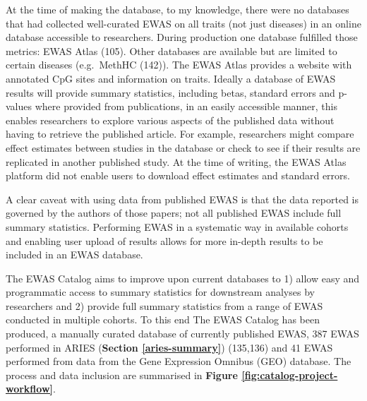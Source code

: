\documentclass[11pt,oneside]{bristolthesis}
\begin{document}
At the time of making the database, to my knowledge, there were no databases that had collected well-curated EWAS on all traits (not just diseases) in an online database accessible to researchers. During production one database fulfilled those metrics: EWAS Atlas (105). Other databases are available but are limited to certain diseases (e.g.~MethHC (142)). The EWAS Atlas provides a website with annotated CpG sites and information on traits. Ideally a database of EWAS results will provide summary statistics, including betas, standard errors and p-values where provided from publications, in an easily accessible manner, this enables researchers to explore various aspects of the published data without having to retrieve the published article. For example, researchers might compare effect estimates between studies in the database or check to see if their results are replicated in another published study. At the time of writing, the EWAS Atlas platform did not enable users to download effect estimates and standard errors.

A clear caveat with using data from published EWAS is that the data reported is governed by the authors of those papers; not all published EWAS include full summary statistics. Performing EWAS in a systematic way in available cohorts and enabling user upload of results allows for more in-depth results to be included in an EWAS database.

The EWAS Catalog aims to improve upon current databases to 1) allow easy and programmatic access to summary statistics for downstream analyses by researchers and 2) provide full summary statistics from a range of EWAS conducted in multiple cohorts. To this end The EWAS Catalog has been produced, a manually curated database of currently published EWAS, 387 EWAS performed in ARIES (\textbf{Section \ref{aries-summary}}) (135,136) and 41 EWAS performed from data from the Gene Expression Omnibus (GEO) database. The process and data inclusion are summarised in \textbf{Figure \ref{fig:catalog-project-workflow}}.
\end{document}
